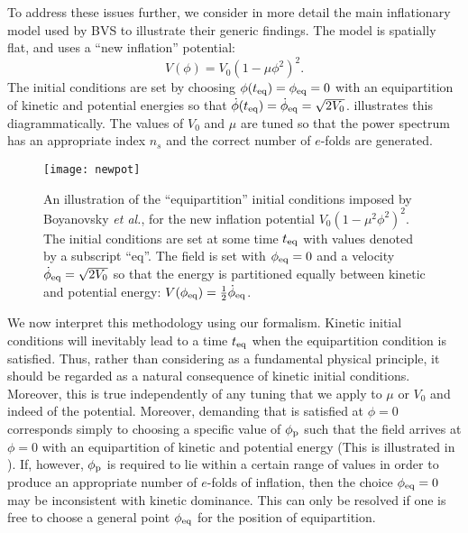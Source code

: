 To address these issues further, we consider in more detail the main
inflationary model used by BVS to illustrate their generic findings.
The model is spatially flat, and uses a ``new inflation'' potential:
%
\begin{equation}
  V(\phi) =V_0\left(1-\mu\phi^2\right)^2.
\end{equation}
%
The initial conditions are set by choosing $\phi(t_{\mathrm{eq}})=\phi_{\mathrm{eq}}=0$ with
an equipartition of kinetic and potential energies so that
$\dot{\phi}(t_{\mathrm{eq}})=\dot{\phi}_{\mathrm{eq}}=\sqrt{2V_0}$.
 illustrates this
diagrammatically.  The values of $V_0$ and $\mu$ are tuned so that the
power spectrum has an appropriate index $n_s$ and the correct number
of $e$-folds are generated.

%
\begin{figure}
  \texttt{[image: newpot]}
  \caption{An illustration of the ``equipartition'' initial conditions
    imposed by Boyanovsky {\it et al.}, for the new inflation
    potential $V_0\left(1-\mu^2\phi^2\right)^2$. The initial
    conditions are set at some time $t_{\mathrm{eq}}$ with values denoted by a
    subscript ``eq''. The field is set with $\phi_{\mathrm{eq}}=0$ and a velocity
    $\dot{\phi}_{\mathrm{eq}}= \sqrt{2V_0}$ so that the energy is partitioned equally
    between kinetic and potential energy: $V(\phi_{\mathrm{eq}}) =
    \frac{1}{2}\dot{\phi}_{\mathrm{eq}}$.  }
  \label{fig:figure_BVS_initial_conditions}
\end{figure}
%

We now interpret this methodology using our formalism. Kinetic initial
conditions will inevitably lead to a time $t_{\mathrm{eq}}$ when the
equipartition condition  is satisfied. Thus, rather
than considering  as a fundamental physical principle,
it should be regarded as a natural consequence of kinetic initial
conditions. Moreover, this is true independently of any tuning that we
apply to $\mu$ or $V_0$ and indeed of the potential. Moreover,
demanding that  is satisfied at $\phi=0$ corresponds
simply to choosing a specific value of $\phi_{\mathrm{p}}$ such that the field
arrives at $\phi=0$ with an equipartition of kinetic and potential
energy (This is illustrated in
).  If, however, $\phi_{\mathrm{p}}$ is
required to lie within a certain range of values in order to produce
an appropriate number of $e$-folds of inflation, then the choice
$\phi_{\mathrm{eq}}=0$ may be inconsistent with kinetic dominance. This can only
be resolved if one is free to choose a general point $\phi_{\mathrm{eq}}$ for the
position of equipartition.  

